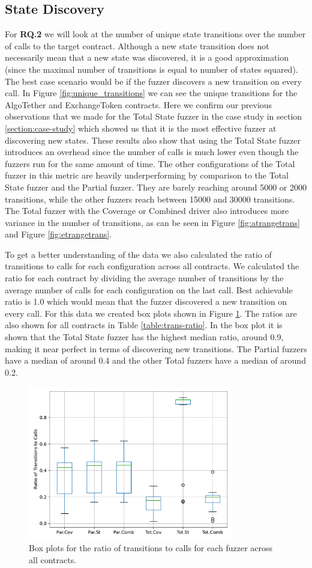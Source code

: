 \subsection*{State Discovery} \label{section:results-state-discovery}
For \textbf{RQ.2} we will look at the number of unique state transitions over the number of calls to the target contract.
Although a new state transition does not necessarily mean that a new state was discovered, it is a good approximation (since the maximal number of transitions is equal to number of states squared).
The best case scenario would be if the fuzzer discovers a new transition on every call.
In Figure \ref{fig:unique_transitions} we can see the unique transitions for the AlgoTether and ExchangeToken contracts.
Here we confirm our previous observations that we made for the Total State fuzzer in the case study in section \ref{section:case-study} which showed us that it is the most effective fuzzer at discovering new states.
These results also show that using the Total State fuzzer introduces an overhead since the number of calls is much lower even though the fuzzers run for the same amount of time.
The other configurations of the Total fuzzer in this metric are heavily underperforming by comparison to the Total State fuzzer and the Partial fuzzer. They are barely reaching around 5000 or 2000 transitions, while the other fuzzers reach between 15000 and 30000 transitions. The Total fuzzer with the Coverage or Combined driver also introduces more variance in the number of transitions, as can be seen in Figure \ref{fig:atrangetrans} and Figure \ref{fig:etrangetrans}.




To get a better understanding of the data we also calculated the ratio of transitions to calls for each configuration across all contracts.
We calculated the ratio for each contract by dividing the average number of transitions by the average number of calls for each configuration on the last call.
Best achievable ratio is 1.0 which would mean that the fuzzer discovered a new transition on every call.
For this data we created box plots shown in Figure \ref{fig:trans-ratio}.
The ratios are also shown for all contracts in Table \ref{table:trans-ratio}.
In the box plot it is shown that the Total State fuzzer has the highest median ratio, around 0.9, making it near perfect in terms of discovering new transitions.
The Partial fuzzers have a median of around 0.4 and the other Total fuzzers have a median of around 0.2.

\begin{figure}[hb]
    \centering
    \includegraphics*[width=0.8\textwidth]{charts/trans-ratio.pdf}
    \caption{Box plots for the ratio of transitions to calls for each fuzzer across all contracts.}\label{fig:trans-ratio}
\end{figure}

